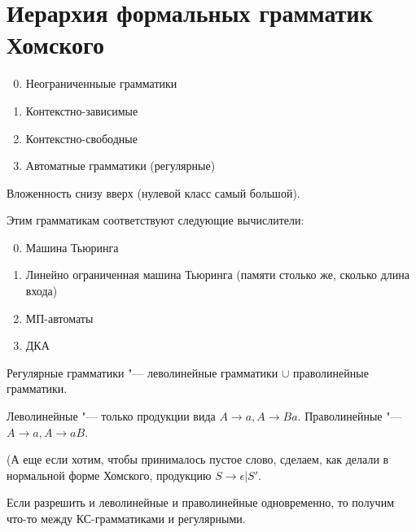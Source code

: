 
\section{Иерархия формальных грамматик Хомского}

\begin{enumerate}
\setcounter{enumi}{-1}

\item
Неограниченныые грамматики

\item
Контекстно-зависимые

\item
Контекстно-свободные

\item
Автоматные грамматики (регулярные)

\end{enumerate}

Вложенность снизу вверх (нулевой класс самый большой).

Этим грамматикам соответствуют следующие вычислители:
\begin{enumerate}
\setcounter{enumi}{-1}
\item
Машина Тьюринга

\item
Линейно ограниченная машина Тьюринга (памяти столько же, сколько длина входа)

\item
МП-автоматы

\item
ДКА

\end{enumerate}

\begin{Def}
Регулярные грамматики "--- леволинейные грамматики $\cup$ праволинейные грамматики.

Леволинейные "--- только продукции вида $A \to a, A \to Ba$.
Праволинейные "--- $A \to a, A \to aB$.

(А еще если хотим, чтобы принималось пустое слово, сделаем, как делали в нормальной форме Хомского, продукцию $S \to \epsilon | S'$.

\end{Def}
\begin{Rem}
Если разрешить и леволинейные и праволинейные одновременно, то получим что-то между КС-грамматиками и регулярными.
\end{Rem}

